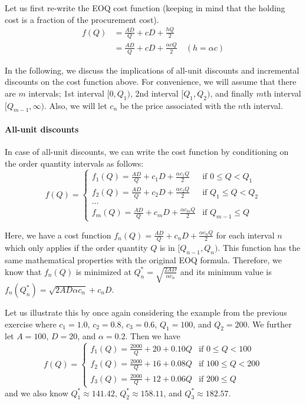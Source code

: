 \begin{solution}
Let us first re-write the EOQ cost function (keeping in mind that the holding cost is a fraction of the procurement cost). 
\begin{align*}
f(Q) 
& = \frac{AD}{Q} + cD + \frac{hQ}{2} \\
& = \frac{AD}{Q} + cD + \frac{\alpha cQ}{2} \quad (h = \alpha c) 
\end{align*}

In the following, we discuss the implications of all-unit discounts and incremental discounts on the cost function above. For convenience, we will assume that there are $m$ intervals; 1st interval $[0,Q_1)$, 2nd interval $[Q_1,Q_2)$, and finally $m$th interval $[Q_{m-1},\infty)$. Also, we will let $c_n$ be the price associated with the $n$th interval. 

\paragraph{All-unit discounts}

In case of all-unit discounts, we can write the cost function by conditioning on the order quantity intervals as follows:
\begin{equation*}
f(Q) = 
\begin{cases}
f_1(Q) = \frac{AD}{Q} + c_1D + \frac{\alpha c_1 Q}{2} & \text{if } 0 \leq Q < Q_1 \\
f_2(Q) = \frac{AD}{Q} + c_2D + \frac{\alpha c_2 Q}{2} & \text{if } Q_1 \leq Q < Q_2 \\
\ldots \\
f_m(Q) = \frac{AD}{Q} + c_mD + \frac{\alpha c_m Q}{2} & \text{if } Q_{m-1} \leq Q 
\end{cases}
\end{equation*}

Here, we have a cost function $f_n(Q) = \frac{AD}{Q} + c_nD + \frac{\alpha c_n Q}{2}$ for each interval $n$ which only applies if the order quantity $Q$ is in $[Q_{n-1},Q_n)$. This function has the same mathematical properties with the original EOQ formula. Therefore, we know that $f_n(Q)$ is minimized at $Q^*_n=\sqrt{\frac{2AD}{\alpha c_n}}$ and its minimum value is $f_n(Q^*_n)=\sqrt{2AD\alpha c_n}+c_n D$.

Let us illustrate this by once again considering the example from the previous exercise where $c_1=1.0$, $c_2=0.8$, $c_3=0.6$, $Q_1=100$, and $Q_2=200$. We further let $A=100$, $D=20$, and $\alpha=0.2$. Then we have 
\begin{equation*}
f(Q) = 
\begin{cases}
f_1(Q) = \frac{2000}{Q} + 20 + 0.10 Q & \text{if } 0 \leq Q < 100 \\
f_2(Q) = \frac{2000}{Q} + 16 + 0.08 Q & \text{if } 100 \leq Q < 200 \\
f_3(Q) = \frac{2000}{Q} + 12 + 0.06 Q & \text{if } 200 \leq Q 
\end{cases}
\end{equation*}
and we also know $Q^*_1\approx 141.42$, $Q^*_2\approx 158.11$, and $Q^*_3\approx 182.57$. 


\end{solution}
